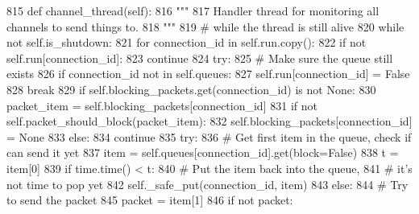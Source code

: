 \begin{DoxyCode}
815     \textcolor{keyword}{def }channel\_thread(self):
816         \textcolor{stringliteral}{"""}
817 \textcolor{stringliteral}{        Handler thread for monitoring all channels to send things to.}
818 \textcolor{stringliteral}{        """}
819         \textcolor{comment}{# while the thread is still alive}
820         \textcolor{keywordflow}{while} \textcolor{keywordflow}{not} self.is\_shutdown:
821             \textcolor{keywordflow}{for} connection\_id \textcolor{keywordflow}{in} self.run.copy():
822                 \textcolor{keywordflow}{if} \textcolor{keywordflow}{not} self.run[connection\_id]:
823                     \textcolor{keywordflow}{continue}
824                 \textcolor{keywordflow}{try}:
825                     \textcolor{comment}{# Make sure the queue still exists}
826                     \textcolor{keywordflow}{if} connection\_id \textcolor{keywordflow}{not} \textcolor{keywordflow}{in} self.queues:
827                         self.run[connection\_id] = \textcolor{keyword}{False}
828                         \textcolor{keywordflow}{break}
829                     \textcolor{keywordflow}{if} self.blocking\_packets.get(connection\_id) \textcolor{keywordflow}{is} \textcolor{keywordflow}{not} \textcolor{keywordtype}{None}:
830                         packet\_item = self.blocking\_packets[connection\_id]
831                         \textcolor{keywordflow}{if} \textcolor{keywordflow}{not} self.packet\_should\_block(packet\_item):
832                             self.blocking\_packets[connection\_id] = \textcolor{keywordtype}{None}
833                         \textcolor{keywordflow}{else}:
834                             \textcolor{keywordflow}{continue}
835                     \textcolor{keywordflow}{try}:
836                         \textcolor{comment}{# Get first item in the queue, check if can send it yet}
837                         item = self.queues[connection\_id].get(block=\textcolor{keyword}{False})
838                         t = item[0]
839                         \textcolor{keywordflow}{if} time.time() < t:
840                             \textcolor{comment}{# Put the item back into the queue,}
841                             \textcolor{comment}{# it's not time to pop yet}
842                             self.\_safe\_put(connection\_id, item)
843                         \textcolor{keywordflow}{else}:
844                             \textcolor{comment}{# Try to send the packet}
845                             packet = item[1]
846                             \textcolor{keywordflow}{if} \textcolor{keywordflow}{not} packet:

\end{DoxyCode}
